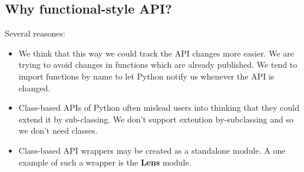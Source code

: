 \documentclass{article}
\begin{document}
\subsection{Why functional-style API?}

Several reasones:
\begin{itemize}
  \item We think that this way we could track the API changes more easier. We
    are trying to avoid changes in functions which are already published. We
    tend to import functions by name to let Python notify us whenever the API is
    changed.
  \item Class-based APIs of Python often mislead users into thinking that they
    could extend it by sub-classing. We don't support extention by-subclassing
    and so we don't need classes.
  \item Class-based API wrappers may be created as a standalone module. A one
    example of such a wrapper is the \textbf{Lens} module.
\end{itemize}
\end{document}
